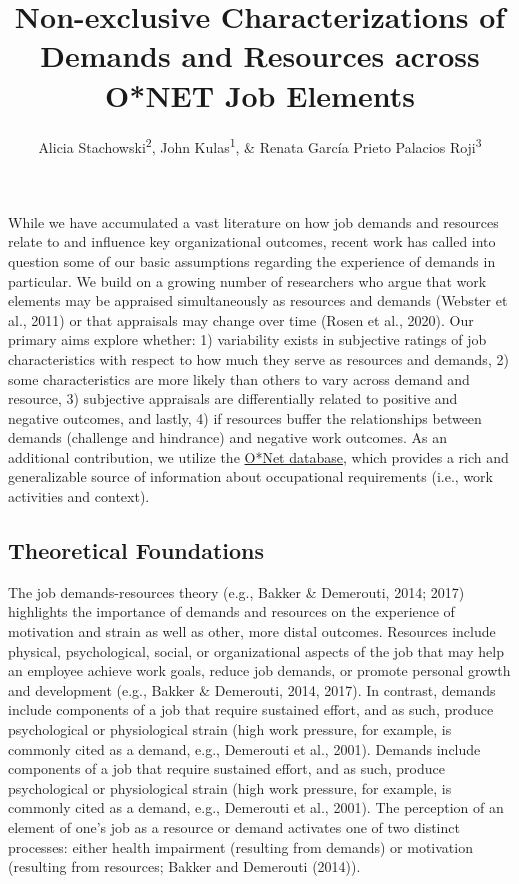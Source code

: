 \documentclass[
  man]{apa7}
\title{Non-exclusive Characterizations of Demands and Resources across O*NET Job Elements}
\author{Alicia Stachowski\textsuperscript{2}, John Kulas\textsuperscript{1}, \& Renata García Prieto Palacios Roji\textsuperscript{3}}
\date{}
\affiliation{\vspace{0.5cm}\textsuperscript{1} eRg\\\textsuperscript{2} University of Wisconsin - Stout\\\textsuperscript{3} PepsiCo}
\begin{document}
\maketitle

While we have accumulated a vast literature on how job demands and resources relate to and influence key organizational outcomes, recent work has called into question some of our basic assumptions regarding the experience of demands in particular. We build on a growing number of researchers who argue that work elements may be appraised simultaneously as resources and demands (Webster et al., 2011) or that appraisals may change over time (Rosen et al., 2020). Our primary aims explore whether: 1) variability exists in subjective ratings of job characteristics with respect to how much they serve as resources and demands, 2) some characteristics are more likely than others to vary across demand and resource, 3) subjective appraisals are differentially related to positive and negative outcomes, and lastly, 4) if resources buffer the relationships between demands (challenge and hindrance) and negative work outcomes. As an additional contribution, we utilize the \href{https://www.onetcenter.org/content.html}{O*Net database}, which provides a rich and generalizable source of information about occupational requirements (i.e., work activities and context).

\subsection{Theoretical Foundations}\label{theoretical-foundations}

The job demands-resources theory (e.g., Bakker \& Demerouti, 2014; 2017) highlights the importance of demands and resources on the experience of motivation and strain as well as other, more distal outcomes. Resources include physical, psychological, social, or organizational aspects of the job that may help an employee achieve work goals, reduce job demands, or promote personal growth and development (e.g., Bakker \& Demerouti, 2014, 2017). In contrast, demands include components of a job that require sustained effort, and as such, produce psychological or physiological strain (high work pressure, for example, is commonly cited as a demand, e.g., Demerouti et al., 2001). Demands include components of a job that require sustained effort, and as such, produce psychological or physiological strain (high work pressure, for example, is commonly cited as a demand, e.g., Demerouti et al., 2001). The perception of an element of one's job as a resource or demand activates one of two distinct processes: either health impairment (resulting from demands) or motivation (resulting from resources; Bakker and Demerouti (2014)).
\end{document}
